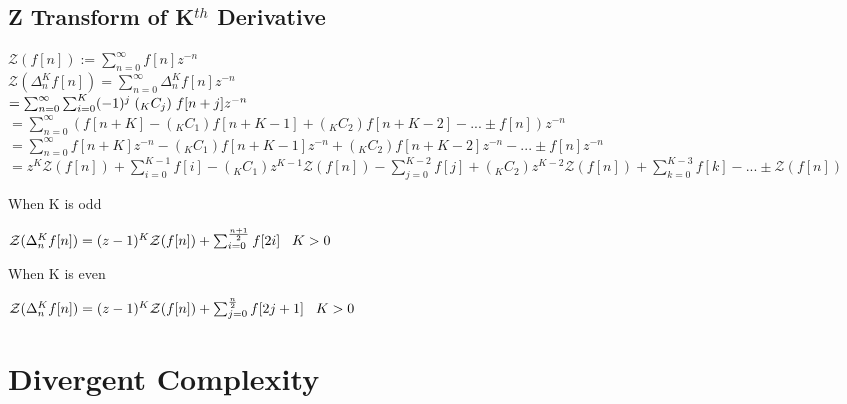 \documentclass[11pt]{article}
\begin{document}
\subsection{Z Transform of K$^{th}$ Derivative}
\vspace{1mm}
\begin{center}
$
\mathcal{Z}(f[n]) := \sum_{n=0}^{\infty}f[n]z^{-n}
$
\\ \vspace{5mm}
$
\mathcal{Z}(\Delta_n^K f[n]) = \sum_{n=0}^{\infty} \Delta_n^K f[n]z^{-n}
$
\\ \vspace{5mm}
$
= \sum_{n=0}^{\infty} \sum_{i=0}^K (-1)^{j} \hspace{1mm} (_K C _j) \hspace{1mm} f[n + j] z^{-n}
$
\\ \vspace{5mm}
$
= \sum_{n=0}^{\infty} (f[n+K] - (_K C _1) f[n+K-1] +  (_K C _2) f[n+K-2] - ...\pm f[n])z^{-n}
$
\\ \vspace{5mm}
$
= \sum_{n=0}^{\infty} f[n+K]z^{-n} - (_K C _1) f[n+K-1]z^{-n} +  (_K C _2) f[n+K-2]z^{-n} - ...\pm f[n]z^{-n}
$
\\ \vspace{5mm}
$
= z^K \mathcal{Z}(f[n]) +\sum_{i=0}^{K-1} f[i] - (_K C _1)z^{K-1} \mathcal{Z}(f[n]) - \sum_{j=0}^{K-2}f[j] + (_K C _2)z^{K-2} \mathcal{Z}(f[n])+\sum_{k=0}^{K-3}f[k] - ... \pm \mathcal{Z}(f[n])
$
\end{center}
When K is odd
\begin{center}
$
\mathcal{Z}(\Delta_n^K f[n]) = (z-1)^K \mathcal{Z}(f[n]) + \sum_{i=0}^{\frac{n+1}{2}} f[2i] \hspace{3mm} K > 0
$
\end{center}
When K is even
\begin{center}
$
\mathcal{Z}(\Delta_n^K f[n]) = (z-1)^K \mathcal{Z}(f[n]) + \sum_{j=0}^{\frac{n}{2}} f[2j + 1] \hspace{3mm} K > 0
$
\end{center}


\section{Divergent Complexity}
\end{document}
